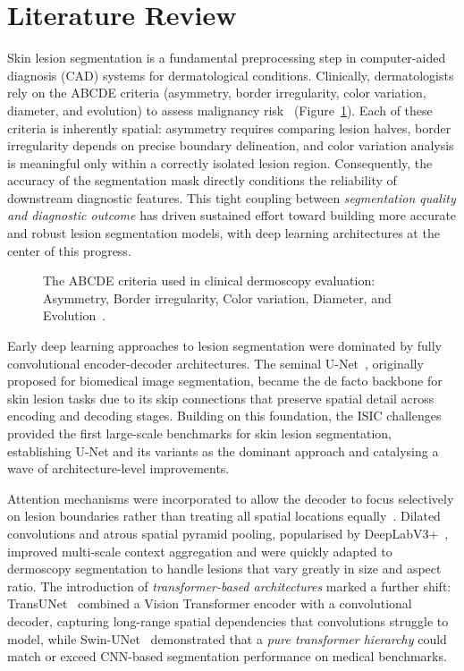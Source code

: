 \section{Literature Review}

Skin lesion segmentation is a fundamental preprocessing step in
computer-aided diagnosis (CAD) systems for dermatological conditions.
Clinically, dermatologists rely on the ABCDE criteria (asymmetry,
border irregularity, color variation, diameter, and evolution) to
assess malignancy risk~\cite{Nachbar1994ABCD} (Figure~\ref{fig:abcde}).
Each of these criteria is inherently spatial: asymmetry requires
comparing lesion halves, border irregularity depends on precise
boundary delineation, and color variation analysis is meaningful
only within a correctly isolated lesion region.
Consequently, the accuracy of the segmentation mask directly
conditions the reliability of downstream diagnostic features.
This tight coupling between \emph{segmentation quality and
diagnostic outcome} has driven sustained effort toward building
more accurate and robust lesion segmentation models, with deep
learning architectures at the center of this progress.


\begin{figure}[H]
    \centering
    \caption{The ABCDE criteria used in clinical dermoscopy evaluation: Asymmetry, Border irregularity, Color variation, Diameter, and Evolution~\cite{Nachbar1994ABCD}.}
    \label{fig:abcde}
\end{figure}


Early deep learning approaches to lesion segmentation were dominated by fully convolutional encoder-decoder architectures.
The seminal U-Net~\cite{Ronneberger2015UNet}, originally proposed for biomedical image segmentation,
became the de facto backbone for skin lesion tasks due to its skip connections that preserve spatial detail across encoding and decoding stages.
Building on this foundation, the ISIC challenges~\cite{Codella2017ISIC, Codella2019ISIC2018}
provided the first large-scale benchmarks for skin lesion segmentation,
establishing U-Net and its variants as the dominant approach and catalysing a wave of architecture-level improvements.

Attention mechanisms were incorporated to allow the decoder to focus selectively on lesion boundaries rather than treating all spatial locations equally~\cite{Oktay2018AttentionUNet}.
Dilated convolutions and atrous spatial pyramid pooling, popularised by DeepLabV3+~\cite{Chen2018DeepLab}, improved multi-scale context aggregation and were quickly adapted to dermoscopy segmentation to handle lesions that vary greatly in size and aspect ratio.
The introduction of \emph{transformer-based architectures} marked a further shift: TransUNet~\cite{Chen2021TransUNet} combined a Vision Transformer encoder with a convolutional decoder, capturing long-range spatial dependencies that convolutions struggle to model, while Swin-UNet~\cite{Cao2021SwinUNet} demonstrated that a \emph{pure transformer hierarchy} could match or exceed CNN-based segmentation performance on medical benchmarks.

